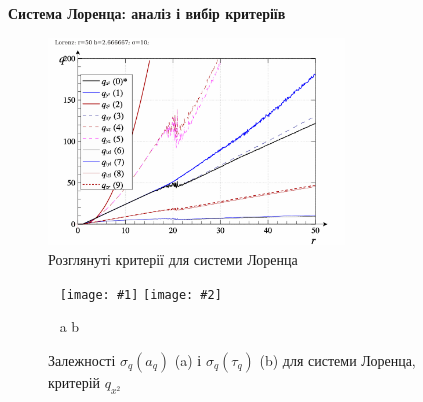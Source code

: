 \documentclass[14pt,handout,utf8]{beamer}
\newcommand{\Xhead}[1]{
 \begin{center}%
      \textbf{#1}%
 \end{center}%
}
\newcommand{\ABlbl}{%
  \vspace{-2.7ex}
  \begin{center}
    ~ \hfill a \hfill\hfill b \hfill ~
  \end{center}
  \vspace{-2.0ex}
}
\newcommand{\PicDouble}[2]{%
 \begin{center}
    ~ \hfill
    \texttt{[image: \#1]}
    \hfill
    \texttt{[image: \#2]}
    \hfill ~
  \end{center}
  \ABlbl
}
\begin{document}
\begin{frame}
  \frametitle{~}

  \Xhead{Система Лоренца: аналіз і вибір критеріїв}

  \begin{figure}
    \includegraphics[width=0.7\textwidth]{../p5/p/cha/lor/lor_q-p_q_r.png}
    \caption{Розглянуті критерії для системи Лоренца}
    \label{atu:f:lor_q}
  \end{figure}

  \begin{figure}
    \PicDouble{../p5/p/cha/lor/lor_qx2_tau-p_aq_sd.png}{../p5/p/cha/lor/lor_qx2_tau-p_tau_sd.png}
    \caption{Залежності $\sigma_{q}(a_q)$ (a) і $\sigma_{q}(\tau_q)$ (b) для системи Лоренца, критерій $q_{x^2}$}
    \label{atu:f:lor_qx2_tau}
  \end{figure}

\end{frame}


\end{document}
